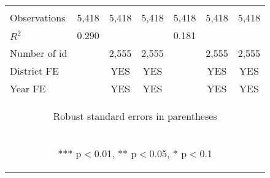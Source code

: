 \begin{center}
\begin{tabular}{lcccccc}
\vspace{4pt} & \begin{footnotesize}\end{footnotesize} & \begin{footnotesize}\end{footnotesize} & \begin{footnotesize}\end{footnotesize} & \begin{footnotesize}\end{footnotesize} & \begin{footnotesize}\end{footnotesize} & \begin{footnotesize}\end{footnotesize} \\
Observations & 5,418 & 5,418 & 5,418 & 5,418 & 5,418 & 5,418 \\
$R^2$ & 0.290 &  &  & 0.181 &  &  \\
Number of id &  & 2,555 & 2,555 &  & 2,555 & 2,555 \\
District FE &  & YES & YES &  & YES & YES \\
 Year FE &  & YES & YES &  & YES & YES \\ \hline
\multicolumn{7}{c}{\begin{footnotesize} Robust standard errors in parentheses\end{footnotesize}} \\
\multicolumn{7}{c}{\begin{footnotesize} *** p$<$0.01, ** p$<$0.05, * p$<$0.1\end{footnotesize}} \\
\end{tabular}
\end{center}
